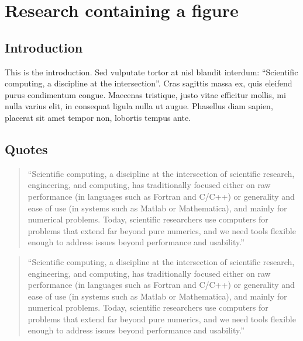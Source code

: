 \hypertarget{research-containing-a-figure}{%
\section{Research containing a
figure}\label{research-containing-a-figure}}

\hypertarget{introduction-1}{%
\subsection{Introduction}\label{introduction-1}}



This is the introduction. Sed vulputate tortor at nisl blandit
interdum: \enquote{Scientific computing, a discipline at the
intersection}\autocite[13]{Perez_Python_2011}. Cras sagittis massa
ex, quis eleifend purus condimentum congue. Maecenas tristique,
justo vitae efficitur mollis, mi nulla varius elit, in consequat
ligula nulla ut augue. Phasellus diam sapien, placerat sit amet
tempor non, lobortis tempus ante.

\hypertarget{quotes}{%
\subsection{Quotes}\label{quotes}}

\begin{quote}
\enquote{Scientific computing, a discipline at the intersection of
scientific research, engineering, and computing, has traditionally
focused either on raw performance (in languages such as Fortran and
C/C++) or generality and ease of use (in systems such as Matlab or
Mathematica), and mainly for numerical problems. Today, scientific
researchers use computers for problems that extend far beyond pure
numerics, and we need tools flexible enough to address issues beyond
performance and usability.}

\autocite[13]{Perez_PythonEcosystem_2011}
\end{quote}


\blockcquote{Perez_PythonEcosystem_2011}{\enquote{Scientific computing, a discipline at the intersection of scientific research, engineering, and computing, has traditionally focused either on raw performance (in languages such as Fortran and C/C++) or generality and ease of use (in systems such as Matlab or Mathematica), and mainly for numerical problems. Today, scientific researchers use computers for problems that extend far beyond pure numerics, and we need tools flexible enough to address issues beyond performance and usability.}}

